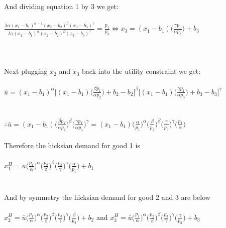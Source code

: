 \documentclass[12pt]{article}
\newenvironment{problem}[2][Problem]{\begin{trivlist}
\item[\hskip \labelsep {\bfseries #1}\hskip \labelsep {\bfseries #2.}]}{\end{trivlist}}
\newcommand\ddfrac[2]{\frac{\displaystyle #1}{\displaystyle #2}}
\begin{document}
\begin{problem}{5}
\\
\\
\\
\\
And dividing equation 1 by 3 we get: 
\\
\\
$\ddfrac{\lambda \alpha (x_1 - b_1)^{\alpha -1} (x_2 - b_2)^\beta (x_3 - b_3)^\gamma}{\lambda \gamma (x_1 - b_1)^\alpha (x_2 - b_2)^\beta (x_3 - b_3)^\gamma} = \ddfrac{p_1}{p_3} \iff x_3 = (x_1 - b_1) \bigg(\ddfrac{\gamma p_1}{\alpha p_3} \bigg) + b_3 $
\\
\\
\\
\\
Next plugging $x_2 $ and $x_3 $ back into the utility constraint we get:
\\
\\
$\bar{u} = (x_1 - b_1)^\alpha \Bigg[(x_1 - b_1) \bigg(\ddfrac{\beta p_1}{\alpha p_2} \bigg) + b_2 - b_2\Bigg]^\beta \Bigg[(x_1 - b_1) \bigg(\ddfrac{\gamma p_1}{\alpha p_3} \bigg) + b_3  - b_3\Bigg]^{\gamma} $
\\
\\
\\
$\therefore \bar{u} =  (x_1 - b_1)  \bigg(\ddfrac{\beta p_1}{\alpha p_2} \bigg)^\beta \bigg(\ddfrac{\gamma p_1}{\alpha p_3} \bigg)^{\gamma} = (x_1 - b_1) \bigg(\ddfrac{\alpha }{ p_1} \bigg)^{\alpha} \bigg(\ddfrac{\beta}{ p_2} \bigg)^\beta   \bigg(\ddfrac{\gamma }{ p_3} \bigg)^{\gamma} \bigg(\ddfrac{p_1}{ \alpha } \bigg)$
\\
\\
Therefore the hicksian demand for good 1 is 
\\
\\
$ x_1^H =  \bar{u} \bigg(\ddfrac{p_1 }{ \alpha} \bigg)^{\alpha} \bigg(\ddfrac{ p_2}{\beta } \bigg)^\beta   \bigg(\ddfrac{p_3}{  \gamma } \bigg)^{\gamma} \bigg(\ddfrac{ \alpha}{ p_1 } \bigg) + b_1$
\\
\\
\\
And by symmetry the hicksian demand for good 2 and 3 are below 
\\
\\
$ x_2^H =  \bar{u} \bigg(\ddfrac{p_1 }{ \alpha} \bigg)^{\alpha} \bigg(\ddfrac{ p_2}{\beta } \bigg)^\beta   \bigg(\ddfrac{p_3}{  \gamma } \bigg)^{\gamma} \bigg(\ddfrac{\beta}{p_2   } \bigg) + b_2$ \hspace{8mm} and \hspace{8mm}
$ x_3^H =  \bar{u} \bigg(\ddfrac{p_1 }{ \alpha} \bigg)^{\alpha} \bigg(\ddfrac{ p_2}{\beta } \bigg)^\beta   \bigg(\ddfrac{p_3}{  \gamma } \bigg)^{\gamma} \bigg(\ddfrac{ \gamma }{ p_3 } \bigg) + b_3$

\end{problem}
\end{document}

